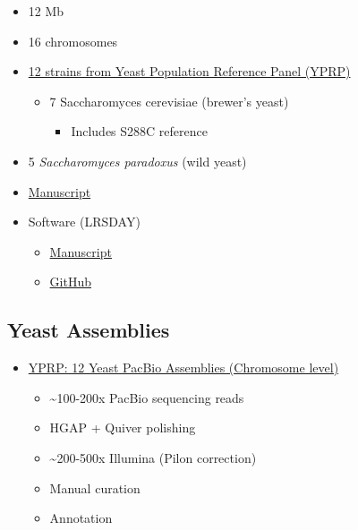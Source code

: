 \documentclass[
]{book}
\providecommand{\tightlist}{%
  \setlength{\itemsep}{0pt}\setlength{\parskip}{0pt}}
\begin{document}
\begin{itemize}
\item
  12 Mb
\item
  16 chromosomes
\item
  \href{https://yjx1217.github.io/Yeast_PacBio_2016/welcome/}{12 strains from Yeast Population Reference Panel (YPRP)}

  \begin{itemize}
  \tightlist
  \item
    7 Saccharomyces cerevisiae (brewer's yeast)

    \begin{itemize}
    \tightlist
    \item
      Includes S288C reference
    \end{itemize}
  \end{itemize}
\item
  5 \emph{Saccharomyces paradoxus} (wild yeast)
\item
  \href{https://www.ncbi.nlm.nih.gov/pmc/articles/PMC2659681/}{Manuscript}
\item
  Software (LRSDAY)

  \begin{itemize}
  \tightlist
  \item
    \href{https://www.nature.com/articles/nprot.2018.025}{Manuscript}
  \item
    \href{https://github.com/yjx1217/LRSDAY}{GitHub}
  \end{itemize}
\end{itemize}

\hypertarget{yeast-assemblies}{%
\subsection{Yeast Assemblies}\label{yeast-assemblies}}

\begin{itemize}
\tightlist
\item
  \href{https://yjx1217.github.io/Yeast_PacBio_2016/data/}{YPRP: 12 Yeast PacBio Assemblies (Chromosome level)}

  \begin{itemize}
  \tightlist
  \item
    \textasciitilde100-200x PacBio sequencing reads
  \item
    HGAP + Quiver polishing
  \item
    \textasciitilde200-500x Illumina (Pilon correction)
  \item
    Manual curation
  \item
    Annotation
  \end{itemize}
\end{itemize}
\end{document}
